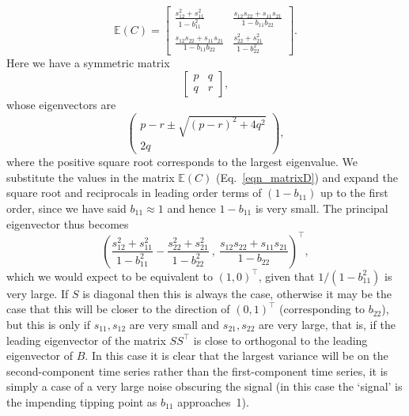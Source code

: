 \documentclass[%
aip,
amsmath,amssymb,
reprint,%
]{revtex4-1}
\newcommand{\noteRed}[1]{{#1}}
\begin{document}
\begin{equation}
\mathbb{E}(C) = \left[ 
\begin{array}{cc}
\frac{s_{12}^2+s_{11}^2}{1-b_{11}^2} & \frac{s_{12}s_{22}+s_{11}s_{21}}{1-b_{11}b_{22}}\\
\frac{s_{12}s_{22}+s_{11}s_{21}}{1-b_{11}b_{22}} & \frac{s_{22}^2+s_{21}^2}{1-b_{22}^2}
\end{array}
\right].
\label{eqn_matrixD}
\end{equation}
{\noteRed Here we have a symmetric matrix
\begin{equation}
\left[ 
\begin{array}{cc}
p & q\\
q & r
\end{array}
\right],
\label{eqn_genMatrix}
\end{equation}
whose eigenvectors are
\begin{equation}
\left(
\begin{array}{c}
p-r\pm\sqrt{(p-r)^2+4q^2}\\
2q
\end{array}
\right),
\label{eqn_genEigenvectors}
\end{equation}
where the positive square root corresponds to the largest eigenvalue. We substitute the values in the matrix $\mathbb{E}(C)$ (Eq.~\ref{eqn_matrixD}) and expand the square root and reciprocals in leading order terms of $(1-b_{11})$ up to the first order, since we have said $b_{11}\approx 1$ and hence $1-b_{11}$ is very small. The principal eigenvector thus becomes}
\begin{equation}
\left(\frac{s_{12}^2+s_{11}^2}{1-b_{11}^2}-\frac{s_{22}^2+s_{21}^2}{1-b_{22}^2} ~,~\frac{s_{12}s_{22}+s_{11}s_{21}}{1-b_{22}}
\right)^\top,
\end{equation}
which we would expect to be equivalent to $(1,0)^\top$, given that $1/(1-b_{11}^2)$ is very large. If $S$ is diagonal then this is always the case, otherwise it may be the case that this will be closer to the direction of $(0,1)^\top$ (corresponding to $b_{22}$), but this is only if $s_{11},s_{12}$ are very small and $s_{21},s_{22}$ are very large, {\noteRed that is, if the leading eigenvector of the matrix $SS^\top$ is close to orthogonal to the leading eigenvector of $B$}. In this case it is clear that the largest variance will be on the second-component time series rather than the first-component time series, it is simply a case of a very large noise obscuring the signal (in this case the `signal' is the impending tipping point as $b_{11}$ approaches~1).
\end{document}
